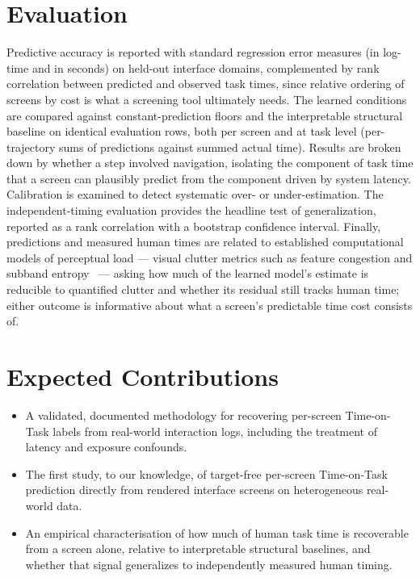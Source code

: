 \documentclass[11pt,a4paper]{article}
\begin{document}
\section{Evaluation}
Predictive accuracy is reported with standard regression error measures (in log-time and in seconds) on held-out interface domains, complemented by rank correlation between predicted and observed task times, since relative ordering of screens by cost is what a screening tool ultimately needs. The learned conditions are compared against constant-prediction floors and the interpretable structural baseline on identical evaluation rows, both per screen and at task level (per-trajectory sums of predictions against summed actual time). Results are broken down by whether a step involved navigation, isolating the component of task time that a screen can plausibly predict from the component driven by system latency. Calibration is examined to detect systematic over- or under-estimation. The independent-timing evaluation provides the headline test of generalization, reported as a rank correlation with a bootstrap confidence interval. Finally, predictions and measured human times are related to established computational models of perceptual load --- visual clutter metrics such as feature congestion and subband entropy~\cite{clutter,aim} --- asking how much of the learned model's estimate is reducible to quantified clutter and whether its residual still tracks human time; either outcome is informative about what a screen's predictable time cost consists of.

\section{Expected Contributions}
\begin{itemize}
  \item A validated, documented methodology for recovering per-screen Time-on-Task labels from real-world interaction logs, including the treatment of latency and exposure confounds.
  \item The first study, to our knowledge, of target-free per-screen Time-on-Task prediction directly from rendered interface screens on heterogeneous real-world data.
  \item An empirical characterisation of how much of human task time is recoverable from a screen alone, relative to interpretable structural baselines, and whether that signal generalizes to independently measured human timing.
\end{itemize}
\end{document}
